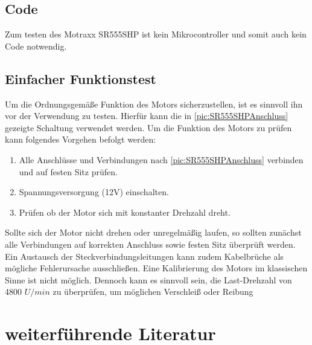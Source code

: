 \subsection{Code}
Zum testen des Motraxx SR555SHP ist kein Mikrocontroller und somit auch kein Code notwendig.

\subsection{Einfacher Funktionstest}
Um die Ordnungsgemäße Funktion des Motors sicherzustellen, ist es sinnvoll ihn vor der Verwendung zu testen. Hierfür kann die in \ref{pic:SR555SHPAnschluss} gezeigte Schaltung verwendet werden. Um die Funktion des Motors zu prüfen kann folgendes Vorgehen befolgt werden: 

\begin{center}
	\begin{enumerate}
		\item Alle Anschlüsse und Verbindungen nach \ref{pic:SR555SHPAnschluss} verbinden und auf festen Sitz prüfen. 
		\item Spannungsversorgung (12V) einschalten.   
		\item Prüfen ob der Motor sich mit konstanter Drehzahl dreht. 
	\end{enumerate}  
\end{center}

Sollte sich der Motor nicht drehen oder unregelmäßig laufen, so sollten zunächst alle Verbindungen auf korrekten Anschluss sowie festen Sitz überprüft werden. Ein Austausch der Steckverbindungsleitungen kann zudem Kabelbrüche als mögliche Fehlerursache ausschließen.
Eine Kalibrierung des Motors im klassischen Sinne ist nicht möglich. Dennoch kann es sinnvoll sein, die Last-Drehzahl von 4800 $U/min$ zu überprüfen, um möglichen Verschleiß oder Reibung 



\section{weiterführende Literatur} 
\begin{center}
	\begin{enumerate}
		
	
	\end{enumerate}
\end{center}
